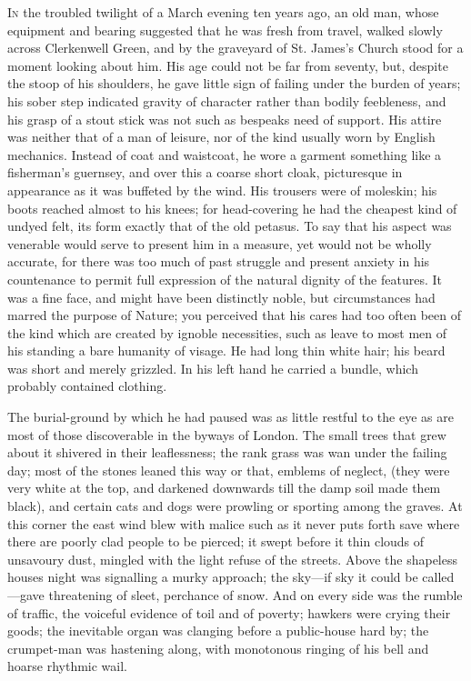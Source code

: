 \textsc{In} the troubled twilight of a March evening ten years ago, an
old man, whose equipment and bearing suggested that he was fresh from
travel, walked slowly across Clerkenwell Green, and by the graveyard of
St. James's Church stood for a moment looking about him. His age could
not be far from seventy, but, despite the stoop of his shoulders, he
gave little sign of failing under the burden of years; his sober step
indicated gravity of character rather than bodily feebleness, and his
grasp of a stout stick was not such as bespeaks need of support. His
attire was neither that of a man of leisure, nor of the kind usually
worn by English {\protect\hypertarget{2}{}{}}mechanics. Instead of coat
and waistcoat, he wore a garment something like a fisherman's guernsey,
and over this a coarse short cloak, picturesque in appearance as it was
buffeted by the wind. His trousers were of moleskin; his boots reached
almost to his knees; for head-covering he had the cheapest kind of
undyed felt, its form exactly that of the old petasus. To say that his
aspect was venerable would serve to present him in a measure, yet would
not be wholly accurate, for there was too much of past struggle and
present anxiety in his countenance to permit full expression of the
natural dignity of the features. It was a fine face, and might have been
distinctly noble, but circumstances had marred the purpose of Nature;
you perceived that his cares had too often been of the kind which are
created by ignoble necessities, such as leave to most men of his
standing a bare humanity of visage. He had long thin white hair; his
beard was short and merely grizzled. In his left hand he carried a
bundle, which probably contained clothing.

{\protect\hypertarget{3}{}{}}The burial-ground by which he had paused
was as little restful to the eye as are most of those discoverable in
the byways of London. The small trees that grew about it shivered in
their leaflessness; the rank grass was wan under the failing day; most
of the stones leaned this way or that, emblems of neglect, (they were
very white at the top, and darkened downwards till the damp soil made
them black), and certain cats and dogs were prowling or sporting among
the graves. At this corner the east wind blew with malice such as it
never puts forth save where there are poorly clad people to be pierced;
it swept before it thin clouds of unsavoury dust, mingled with the light
refuse of the streets. Above the shapeless houses night was signalling a
murky approach; the sky---if sky it could be called---gave threatening
of sleet, perchance of snow. And on every side was the rumble of
traffic, the voiceful evidence of toil and of poverty; hawkers were
crying their goods; the inevitable organ was clanging before a
public-house hard by; {\protect\hypertarget{4}{}{}}the crumpet-man was
hastening along, with monotonous ringing of his bell and hoarse rhythmic
wail.

